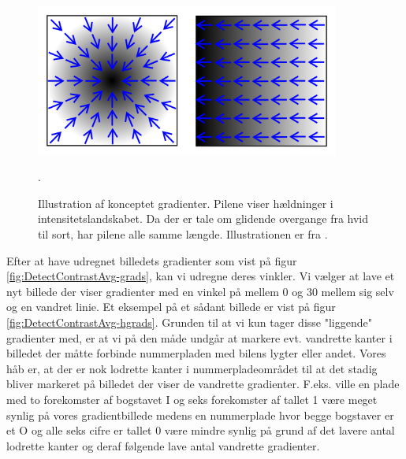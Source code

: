\begin{figure}[htp]
\centering
\includegraphics[width=10cm]{system/illu/gradienter.png} 
\caption{Illustration af konceptet gradienter. Pilene viser hældninger i intensitetslandskabet. Da der er tale om glidende overgange fra hvid til sort, har pilene alle samme længde. Illustrationen er fra \cite{wiki_gradienter}.}.
\label{fig:gradienter}
\end{figure}

Efter at have udregnet billedets gradienter som vist på figur \vref{fig:DetectContrastAvg-grads}, kan vi udregne deres vinkler. Vi vælger at lave et nyt billede der viser gradienter med en vinkel på mellem 0 og 30 mellem sig selv og en vandret linie. Et eksempel på et sådant billede er vist på figur \vref{fig:DetectContrastAvg-hgrads}. Grunden til at vi kun tager disse "liggende" gradienter med, er at vi på den måde undgår at markere evt. vandrette kanter i billedet der måtte forbinde nummerpladen med bilens lygter eller andet. Vores håb er, at der er nok lodrette kanter i nummerpladeområdet til at det stadig bliver markeret på billedet der viser de vandrette gradienter. F.eks. ville en plade med to forekomster af bogstavet I og seks forekomster af tallet 1 være meget synlig på vores gradientbillede medens en nummerplade hvor begge bogstaver er et O og alle seks cifre er tallet 0 være mindre synlig på grund af det lavere antal lodrette kanter og deraf følgende lave antal vandrette gradienter.

